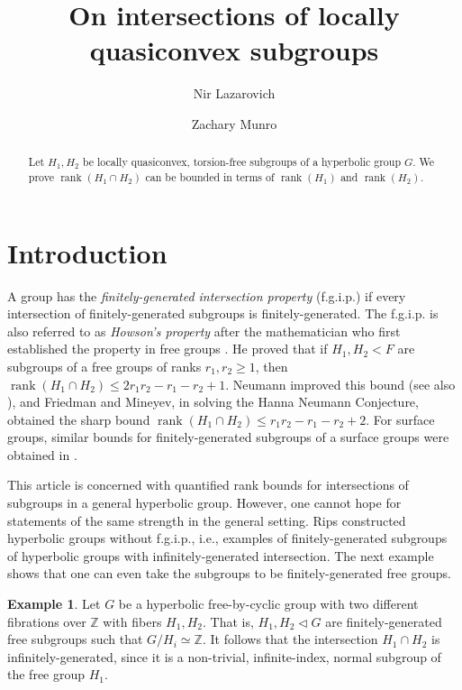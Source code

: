 \documentclass[article, 12pt]{amsart}
\title{On intersections of locally quasiconvex subgroups}
\author{Nir Lazarovich}
\author{Zachary Munro}
\date{}
\numberwithin{equation}{section}
\theoremstyle{definition}
\newtheorem{example}[theorem]{Example}
\newcommand{\bbZ}{\mathbb{Z}}
\newcommand{\normalin}{\lhd}
\DeclareMathOperator{\rank}{rank}
\begin{document}
\maketitle


\begin{abstract}
Let $H_1, H_2$ be locally quasiconvex, torsion-free subgroups of a hyperbolic group $G$.
We prove $\rank(H_1\cap H_2)$ can be bounded in terms of $\rank(H_1)$ and $\rank(H_2)$.
\end{abstract}

\section{Introduction}

A group has the \emph{finitely-generated intersection property} (f.g.i.p.) if every intersection of finitely-generated subgroups is finitely-generated. 
The f.g.i.p. is also referred to as \emph{Howson's property} after the mathematician who first established the property in free groups \cite{howson1954intersection}.
He proved that if $H_1,H_2<F$ are subgroups of a free groups of ranks $r_1,r_2\ge 1$, then
$\rank(H_1\cap H_2)\le 2r_1r_2-r_1-r_2+1$.
Neumann \cite{neumann1956hanna} improved this bound (see also \cite{neumann1990walter}), 
and Friedman\cite{friedman2015sheaves} and Mineyev\cite{mineyev2012submultiplicativity}, in solving the Hanna Neumann Conjecture, obtained the sharp bound $\rank(H_1\cap H_2)\le r_1r_2-r_1-r_2+2$.
For surface groups, similar bounds for finitely-generated subgroups of a surface groups were obtained in \cite{antolin2022hanna, soma1990intersection, soma1991intersection}.



This article is concerned with quantified rank bounds for intersections of subgroups in a general hyperbolic group.
However, one cannot hope for statements of the same strength in the general setting.
Rips \cite[Corollary (a)]{rips1982subgroups} constructed hyperbolic groups without f.g.i.p., i.e., examples of finitely-generated subgroups of hyperbolic groups with infinitely-generated intersection. 
The next example shows that one can even take the subgroups to be finitely-generated free groups.

\begin{example}\label{example: two fibers}
    Let $G$ be a hyperbolic free-by-cyclic group with two different fibrations over $\bbZ$ with fibers $H_1,H_2$. 
    That is, $H_1,H_2\normalin G$ are finitely-generated free subgroups such that $G/H_i\simeq \bbZ$. It follows that the intersection $H_1\cap H_2$ is infinitely-generated, since it is a non-trivial, infinite-index, normal subgroup of the free group $H_1$.
\end{example}
\end{document}
